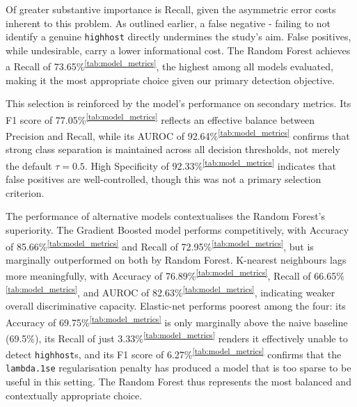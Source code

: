 \documentclass[11pt]{article}\usepackage[]{graphicx}\usepackage[]{xcolor}
\begin{document}
Of greater substantive importance is Recall, given the asymmetric error costs inherent to this 
problem. As outlined earlier, a false negative - failing to not identify a genuine \texttt{highhost} directly undermines the 
study's aim. 
False positives, while undesirable, carry a lower informational cost. The Random Forest achieves 
a Recall of 73.65\%\textsuperscript{\ref{tab:model_metrics}}, the highest among all models 
evaluated, making it the most appropriate choice given our primary detection objective.

This selection is reinforced by the model's performance on secondary metrics. Its F1 score of 
77.05\%\textsuperscript{\ref{tab:model_metrics}} reflects an effective balance between Precision 
and Recall, while its AUROC of 92.64\%\textsuperscript{\ref{tab:model_metrics}} confirms that 
strong class separation is maintained across all decision thresholds, not merely the default 
$\tau = 0.5$. High Specificity of 92.33\%\textsuperscript{\ref{tab:model_metrics}} indicates 
that false positives are well-controlled, though this was not a primary selection criterion.

The performance of alternative models contextualises the Random Forest's superiority. The 
Gradient Boosted model performs competitively, with Accuracy of 
85.66\%\textsuperscript{\ref{tab:model_metrics}} and Recall of 
72.95\%\textsuperscript{\ref{tab:model_metrics}}, but is marginally outperformed on both by Random Forest. K-nearest neighbours lags more meaningfully, with Accuracy of 
76.89\%\textsuperscript{\ref{tab:model_metrics}}, Recall of 
66.65\%\textsuperscript{\ref{tab:model_metrics}}, and AUROC of 
82.63\%\textsuperscript{\ref{tab:model_metrics}}, indicating weaker overall discriminative 
capacity. Elastic-net performs poorest among the four: its Accuracy of
69.75\%\textsuperscript{\ref{tab:model_metrics}} is only marginally above the naive baseline (69.5\%), its Recall 
of just 3.33\%\textsuperscript{\ref{tab:model_metrics}} renders it effectively unable to 
detect \texttt{highhost}s, and its F1 score of 
6.27\%\textsuperscript{\ref{tab:model_metrics}} confirms that the \texttt{lambda.1se} 
regularisation penalty has produced a model that is too sparse to be useful in this setting. 
The Random Forest thus represents the most balanced and contextually appropriate choice.
\end{document}
